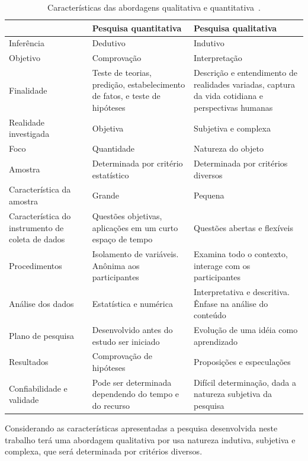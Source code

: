 \newpage
\begin{table}[htb]
\center
\footnotesize
\begin{tabular}{|p{4cm}|p{5cm}|p{5cm}|}
  \hline
   \textbf{} & \textbf{Pesquisa quantitativa}  & \textbf{Pesquisa qualitativa}\\
    \hline
   	Inferência & Dedutivo & Indutivo\\
   \hline    
    	Objetivo & Comprovação & Interpretação\\
   \hline
	Finalidade & Teste de teorias, predição, estabelecimento de fatos, e teste de hipóteses & Descrição e entendimento de realidades variadas, captura da vida cotidiana e perspectivas humanas\\
   \hline
	Realidade investigada & Objetiva & Subjetiva e complexa\\
   \hline
	Foco & Quantidade & Natureza do objeto\\
   \hline
	Amostra & Determinada por critério estatístico & Determinada por critérios diversos\\
   \hline
	Característica da amostra & Grande & Pequena\\
   \hline
	Característica do instrumento de coleta de dados & Questões objetivas, aplicações em um curto espaço de tempo & Questões abertas e flexíveis\\
   \hline
	Procedimentos & Isolamento de variáveis. Anônima aos participantes & Examina todo o contexto, interage com os participantes\\
   \hline
	Análise dos dados & Estatística e numérica & Interpretativa e descritiva. Ênfase na análise do conteúdo\\
   \hline
	Plano de pesquisa & Desenvolvido antes do estudo ser iniciado & Evolução de uma idéia como aprendizado\\
   \hline
	Resultados & Comprovação de hipóteses & Proposições e especulações\\
   \hline
	Confiabilidade e validade & Pode ser determinada dependendo do tempo e do recurso & Difícil determinação, dada a natureza subjetiva da pesquisa\\
   \hline
\end{tabular}
\caption{Características das abordagens qualitativa e quantitativa~\cite{terence2006abordagem}.}
\end{table}

Considerando as características apresentadas a pesquisa desenvolvida neste trabalho
terá uma abordagem qualitativa por usa natureza indutiva, subjetiva e complexa, que será 
determinada por critérios diversos.

